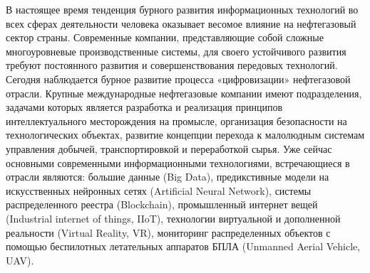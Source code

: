 {\actuality} 
В настоящее время тенденция бурного развития информационных технологий во всех сферах деятельности человека оказывает весомое влияние на нефтегазовый сектор страны. Современные компании, представляющие собой сложные многоуровневые производственные системы, для своего устойчивого развития требуют постоянного развития и совершенствования передовых технологий.  Сегодня наблюдается  бурное развитие процесса «цифровизации» нефтегазовой отрасли. Крупные международные нефтегазовые компании имеют подразделения, задачами которых является разработка и реализация принципов интеллектуального месторождения \cite{Tcharo2018} на промысле, организация безопасности на технологических объектах, развитие концепции  перехода к малолюдным системам управления добычей, транспортировкой и переработкой сырья. Уже сейчас основными современными информационными технологиями, встречающиеся в отрасли являются: большие данные (Big Data), предикстивные модели на искусственных нейронных сетях (Artificial Neural Network), системы распределенного реестра (Blockchain), промышленный интернет вещей (Industrial internet of things, IIoT), технологии виртуальной и дополненной реальности (Virtual Reality, VR), мониторинг распределенных объектов с помощью беспилотных летательных аппаратов БПЛА (Unmanned Aerial Vehicle, UAV). 

